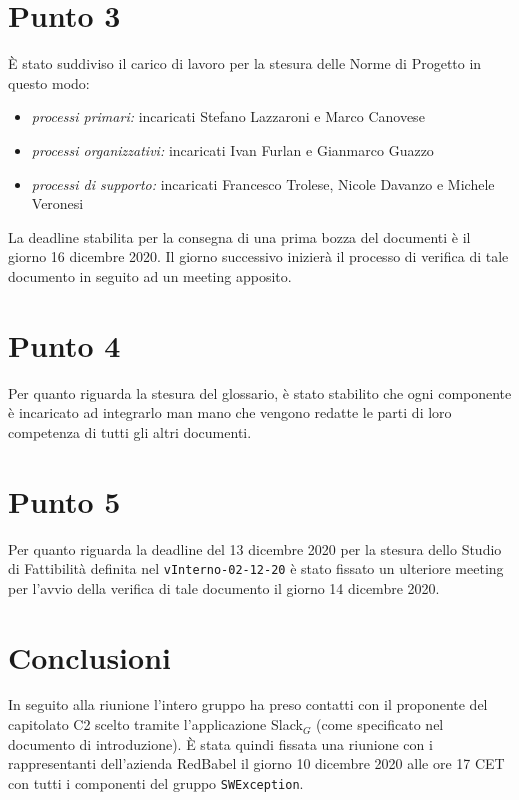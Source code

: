 \documentclass[12pt,italian,a4paper]{article}
\begin{document}
	\section*{Punto 3}
	È stato suddiviso il carico di lavoro per la stesura delle Norme di Progetto in questo modo:
	\begin{itemize}
		\item \textit{processi primari:} incaricati Stefano Lazzaroni e Marco Canovese
		\item \textit{processi organizzativi:} incaricati Ivan Furlan e Gianmarco Guazzo
		\item \textit{processi di supporto:} incaricati Francesco Trolese, Nicole Davanzo e Michele Veronesi
	\end{itemize}
	La deadline stabilita per la consegna di una prima bozza del documenti è il giorno 16 dicembre 2020. Il giorno successivo inizierà il processo di verifica di tale documento in seguito ad un meeting apposito.

	\section*{Punto 4}
	Per quanto riguarda la stesura del glossario, è stato stabilito che ogni componente è incaricato ad integrarlo man mano che vengono redatte le parti di loro competenza di tutti gli altri documenti.
	
	\section*{Punto 5}
	Per quanto riguarda la deadline del 13 dicembre 2020 per la stesura dello Studio di Fattibilità definita nel \verb|vInterno-02-12-20| è stato fissato un ulteriore meeting per l'avvio della verifica di tale documento il giorno 14 dicembre 2020.
	
	\section*{Conclusioni}
	In seguito alla riunione l'intero gruppo ha preso contatti con il proponente del capitolato C2 scelto tramite l'applicazione Slack$_G$ (come specificato nel documento di introduzione). È stata quindi fissata una riunione con i rappresentanti dell'azienda RedBabel il giorno 10 dicembre 2020 alle ore 17 CET con tutti i componenti del gruppo \verb|SWException|.
	
\end{document}
